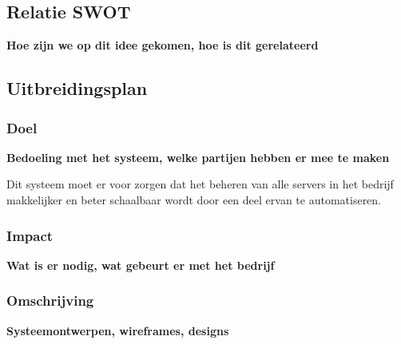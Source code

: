 \subsection{Relatie SWOT}
{\bf Hoe zijn we op dit idee gekomen, hoe is dit gerelateerd}


\subsection{Uitbreidingsplan}

\subsubsection{Doel}
{\bf Bedoeling met het systeem, welke partijen hebben er mee te maken}

Dit systeem moet er voor zorgen dat het beheren van alle servers in het bedrijf
makkelijker en beter schaalbaar wordt door een deel ervan te automatiseren.

\subsubsection{Impact}
{\bf Wat is er nodig, wat gebeurt er met het bedrijf}

\subsubsection{Omschrijving}
{\bf Systeemontwerpen, wireframes, designs}
